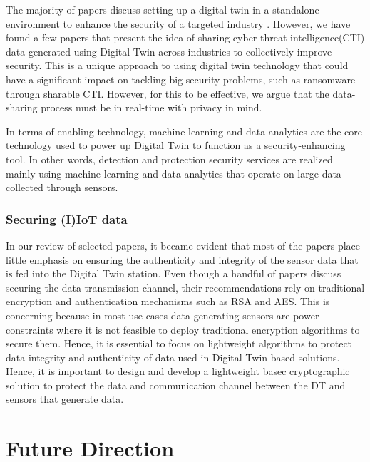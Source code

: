 The majority of papers discuss setting up a digital twin in a standalone environment to enhance the security of a targeted industry \cite{almeaibedDigitalTwinAnalysis2021, veledarDigitalTwinsDependability2019, chukkapalliCyberPhysicalSystemSecurity2021, adrienbacueDigitalTwinsEnhanced2022}. However, we have found a few papers that present the idea of sharing cyber threat intelligence(CTI) \cite{dietzHarnessingDigitalTwin2022, almeaibedDigitalTwinAnalysis2021} data generated using Digital Twin across industries to collectively improve security. This is a unique approach to using digital twin technology that could have a significant impact on tackling big security problems, such as ransomware through sharable CTI. However, for this to be effective, we argue that the data-sharing process must be in real-time with privacy in mind. 


In terms of enabling technology, machine learning and data analytics are the core technology used to power up Digital Twin to function as a security-enhancing tool. In other words, detection and protection security services are realized mainly using machine learning and data analytics that operate on large data collected through sensors. 


\subsubsection{Securing (I)IoT data}
In our review of selected papers, it became evident that most of the papers place little emphasis on ensuring the authenticity and integrity of the sensor data that is fed into the Digital Twin station. Even though a handful of papers discuss securing the data transmission channel, their recommendations rely on traditional encryption and authentication mechanisms such as RSA and AES. This is concerning because in most use cases data generating sensors are power constraints where it is not feasible to deploy traditional encryption algorithms to secure them. Hence, it is essential to focus on lightweight algorithms to protect data integrity and authenticity of data used in Digital Twin-based solutions. Hence, it is important to design and develop a lightweight basec cryptographic solution to protect the data and communication channel between the DT and sensors that generate data.  




\section{Future Direction}

